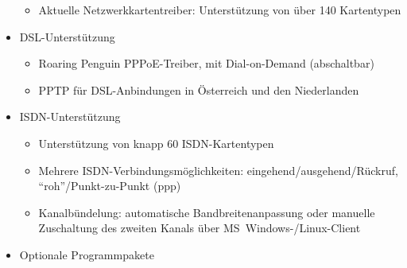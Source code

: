 \begin{itemize}
\begin{itemize}
\item Aktuelle Netzwerkkartentreiber: Unterstützung von über 140 Kartentypen
\end{itemize}

\item DSL-Unterstützung

\begin{itemize}
\item Roaring Penguin PPPoE-Treiber, mit Dial-on-Demand (abschaltbar)
\item PPTP für DSL-Anbindungen in Österreich und den Niederlanden
\end{itemize}

\item ISDN-Unterstützung

\begin{itemize}
\item Unterstützung von knapp 60 ISDN-Kartentypen
\item Mehrere ISDN-Verbindungsmöglichkeiten: eingehend/ausgehend/Rückruf,
      "`roh"'/Punkt-zu-Punkt (ppp)
\item Kanalbündelung: automatische Bandbreitenanpassung oder manuelle
      Zuschaltung des zweiten Kanals über MS~Windows-/Linux-Client
\end{itemize}

\item Optionale Programmpakete


\end{itemize}
